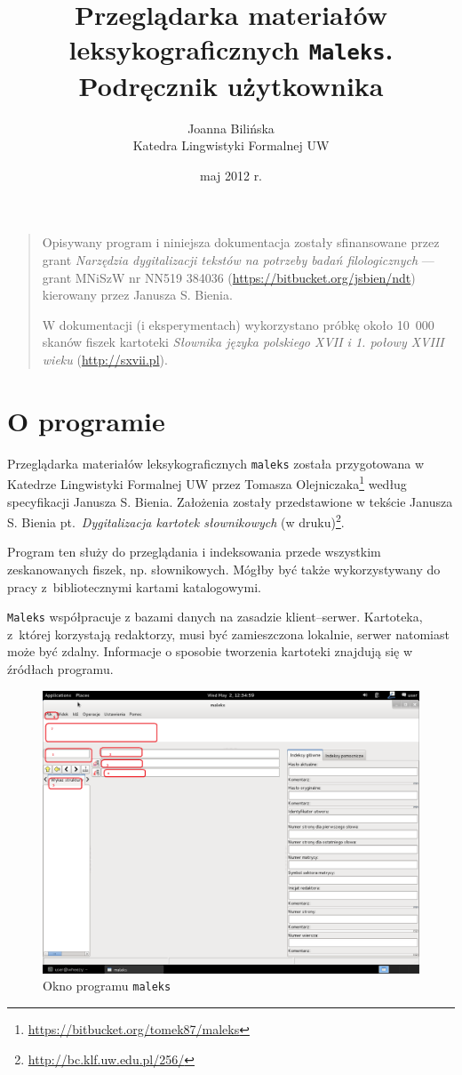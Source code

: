 \documentclass[12pt,oneside,notitlepage,titleauthor]{mwart}%
\title{Przeglądarka materiałów leksykograficznych \texttt{Maleks}. \\Podręcznik użytkownika}%
\author{Joanna Bilińska\\Katedra Lingwistyki Formalnej UW}
\date{maj 2012 r.}
\begin{document}
\maketitle

\begin{quotation}
Opisywany program i niniejsza dokumentacja zostały sfinansowane przez grant \textit{Narzędzia dygitalizacji tekstów na potrzeby badań filologicznych} --- grant MNiSzW nr NN519 384036 (\url{https://bitbucket.org/jsbien/ndt}) kierowany przez Janusza S. Bienia. 

W dokumentacji (i eksperymentach) wykorzystano próbkę około 10~000 skanów fiszek kartoteki \textit{Słownika języka polskiego XVII i 1. połowy XVIII wieku}  (\url{http://sxvii.pl}).
\end{quotation}

\section{O programie}


Przeglądarka materiałów leksykograficznych \texttt{maleks} została przygotowana w Katedrze Lingwistyki Formalnej UW przez Tomasza Olejniczaka\footnote{\url{https://bitbucket.org/tomek87/maleks}}   według specyfikacji Janusza S. Bienia. Założenia zostały przedstawione w tekście Janusza S. Bienia pt.~\textit{Dygitalizacja kartotek słownikowych} (w druku)\footnote{\url{http://bc.klf.uw.edu.pl/256/}}.

Program ten służy do przeglądania i indeksowania przede wszystkim zeskanowanych fiszek, np. słownikowych. Mógłby być także wykorzystywany do pracy z~bibliotecznymi kartami katalogowymi.

\texttt{Maleks} współpracuje z bazami danych na zasadzie klient--serwer. Kartoteka, z~której korzystają redaktorzy, musi być zamieszczona lokalnie, serwer natomiast może być zdalny. Informacje o sposobie tworzenia kartoteki znajdują się w źródłach programu.


\begin{figure}[h]
\includegraphics[scale=0.3]{01_puste.png}
\caption{Okno programu \texttt{maleks}}
\label{01_puste}
\end{figure}
\end{document}
